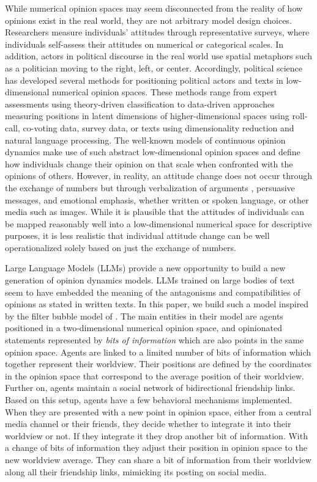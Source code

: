 \documentclass[]{ceurart}
\begin{document}
While numerical opinion spaces may seem disconnected from the reality of
how opinions exist in the real world, they are not arbitrary model
design choices. Researchers measure individuals' attitudes through
representative surveys, where individuals self-assess their attitudes on
numerical or categorical scales. In addition, actors in political
discourse in the real world use spatial metaphors such as a politician
moving to the right, left, or center. Accordingly, political science has
developed several methods for positioning political actors and texts in
low-dimensional numerical opinion spaces. These methods range from
expert assessments using theory-driven classification to data-driven
approaches measuring positions in latent dimensions of
higher-dimensional spaces using roll-call, co-voting data, survey data,
or texts using dimensionality reduction and natural language processing.
The well-known models of continuous opinion dynamics
\citep[see][]{Lorenz2025ExploringTheoryAgentbased} make use of such
abstract low-dimensional opinion spaces and define how individuals
change their opinion on that scale when confronted with the opinions of
others. However, in reality, an attitude change does not occur through
the exchange of numbers but through verbalization of arguments
\citep{BanischOlbrich2019OpinionPolarizationLearning}, persuasive
messages, and emotional emphasis, whether written or spoken language, or
other media such as images. While it is plausible that the attitudes of
individuals can be mapped reasonably well into a low-dimensional
numerical space for descriptive purposes, it is less realistic that
individual attitude change can be well operationalized solely based on
just the exchange of numbers.

Large Language Models (LLMs) provide a new opportunity to build a new
generation of opinion dynamics models. LLMs trained on large bodies of
text seem to have embedded the meaning of the antagonisms and
compatibilities of opinions as stated in written texts. In this paper,
we build such a model inspired by the filter bubble model of
\citet{GeschkeEtAl2019TriplefilterBubbleUsing}. The main entities in
their model are agents positioned in a two-dimensional numerical opinion
space, and opinionated statements represented by \emph{bits of
information} which are also points in the same opinion space. Agents are
linked to a limited number of bits of information which together
represent their worldview. Their positions are defined by the
coordinates in the opinion space that correspond to the average position
of their worldview. Further on, agents maintain a social network of
bidirectional friendship links. Based on this setup, agents have a few
behavioral mechanisms implemented. When they are presented with a new
point in opinion space, either from a central media channel or their
friends, they decide whether to integrate it into their worldview or
not. If they integrate it they drop another bit of information. With a
change of bits of information they adjust their position in opinion
space to the new worldview average. They can share a bit of information
from their worldview along all their friendship links, mimicking its
posting on social media.
\end{document}
